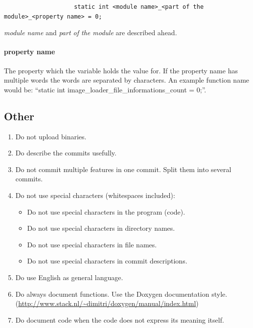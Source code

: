 \documentclass{article}
\begin{document}
				\begin{lstlisting}
					static int <module name>_<part of the module>_<property name> = 0;
				\end{lstlisting}
				
				\emph{module name} and \emph{part of the module} are described ahead.
				
				\paragraph{property name} The property which the variable holds the value for. If the property name has multiple words the words are separated by characters. An example function name would be: ``static int image\_loader\_file\_informations\_count = 0;''.
		
		\subsection{Other}
			\begin{enumerate}
				\item Do not upload binaries.
				\item Do describe the commits usefully.
				\item Do not commit multiple features in one commit. Split them into several commits.
				\item Do not use special characters (whitespaces included):
					\begin{itemize}
						\item Do not use special characters in the program (code).
						\item Do not use special characters in directory names.
						\item Do not use special characters in file names.
						\item Do not use special characters in commit descriptions.
					\end{itemize}
				\item Do use English as general language.
				\item Do always document functions. Use the Doxygen documentation style. (\url{http://www.stack.nl/~dimitri/doxygen/manual/index.html})
				\item Do document code when the code does not express its meaning itself.
			\end{enumerate}
\end{document}
